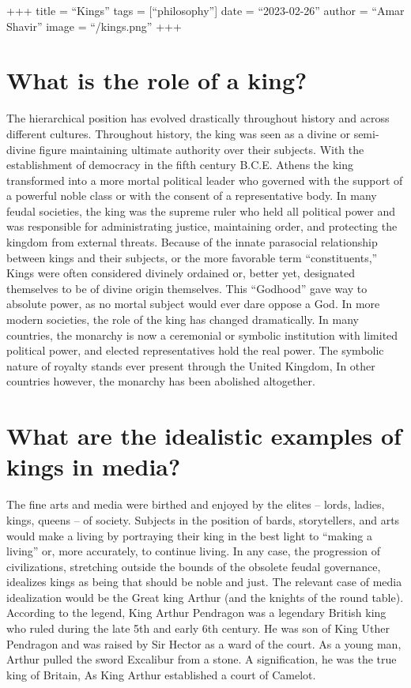 \documentclass[
]{article}
\author{}
\date{}
\begin{document}
+++ title = ``Kings'' tags = {[}``philosophy''{]} date = ``2023-02-26''
author = ``Amar Shavir'' image = ``/kings.png'' +++

\hypertarget{what-is-the-role-of-a-king}{%
\section{What is the role of a king?}\label{what-is-the-role-of-a-king}}

The hierarchical position has evolved drastically throughout history and
across different cultures. Throughout history, the king was seen as a
divine or semi-divine figure maintaining ultimate authority over their
subjects. With the establishment of democracy in the fifth century
B.C.E. Athens the king transformed into a more mortal political leader
who governed with the support of a powerful noble class or with the
consent of a representative body. In many feudal societies, the king was
the supreme ruler who held all political power and was responsible for
administrating justice, maintaining order, and protecting the kingdom
from external threats. Because of the innate parasocial relationship
between kings and their subjects, or the more favorable term
``constituents,'' Kings were often considered divinely ordained or,
better yet, designated themselves to be of divine origin themselves.
This ``Godhood'' gave way to absolute power, as no mortal subject would
ever dare oppose a God. In more modern societies, the role of the king
has changed dramatically. In many countries, the monarchy is now a
ceremonial or symbolic institution with limited political power, and
elected representatives hold the real power. The symbolic nature of
royalty stands ever present through the United Kingdom, In other
countries however, the monarchy has been abolished altogether.

\hypertarget{what-are-the-idealistic-examples-of-kings-in-media}{%
\section{What are the idealistic examples of kings in
media?}\label{what-are-the-idealistic-examples-of-kings-in-media}}

The fine arts and media were birthed and enjoyed by the elites -- lords,
ladies, kings, queens -- of society. Subjects in the position of bards,
storytellers, and arts would make a living by portraying their king in
the best light to ``making a living'' or, more accurately, to continue
living. In any case, the progression of civilizations, stretching
outside the bounds of the obsolete feudal governance, idealizes kings as
being that should be noble and just. The relevant case of media
idealization would be the Great king Arthur (and the knights of the
round table). According to the legend, King Arthur Pendragon was a
legendary British king who ruled during the late 5th and early 6th
century. He was son of King Uther Pendragon and was raised by Sir Hector
as a ward of the court. As a young man, Arthur pulled the sword
Excalibur from a stone. A signification, he was the true king of
Britain, As King Arthur established a court of Camelot.
\end{document}
